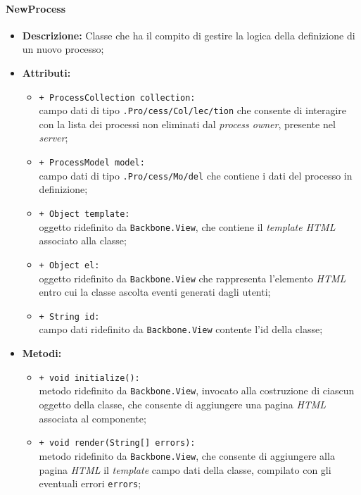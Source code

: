 \paragraph{NewProcess}
\begin{flushleft}
\begin{itemize}
\item \textbf{Descrizione:} Classe che ha il compito di gestire la logica della definizione di un nuovo processo;
\item \textbf{Attributi:}
\begin{sloppypar}
\begin{itemize}
\item \texttt{+ ProcessCollection collection:}\\ campo dati di tipo \texttt{\collection{}.Pro\fshyp{}cess\fshyp{}Col\fshyp{}lec\fshyp{}tion} che consente di interagire con la lista dei processi non eliminati dal \textit{process owner}, presente nel \textit{server};
\item \texttt{+ ProcessModel model:}\\ campo dati di tipo \texttt{\model{}.Pro\fshyp{}cess\fshyp{}Mo\fshyp{}del} che contiene i dati del processo in definizione;
\item \texttt{+ Object template:}\\ oggetto ridefinito da \texttt{Backbone.View}, che contiene il \textit{template HTML} associato alla classe;
\item \texttt{+ Object el:}\\ oggetto ridefinito da \texttt{Backbone.View} che rappresenta l'elemento \textit{HTML} entro cui la classe ascolta eventi generati dagli utenti;
\item \texttt{+ String id:}\\ campo dati ridefinito da \texttt{Backbone.View} contente l'id della classe;
\end{itemize}
\end{sloppypar}
\item \textbf{Metodi:}
\begin{sloppypar}
\begin{itemize}
\item \texttt{+ void initialize():}\\ metodo ridefinito da \texttt{Backbone.View}, invocato alla costruzione di ciascun oggetto della classe, che consente di aggiungere una pagina \textit{HTML} associata al componente;
\item \texttt{+ void render(String[] errors):}\\ metodo ridefinito da \texttt{Backbone.View}, che consente di aggiungere alla pagina \textit{HTML} il \textit{template} campo dati della classe, compilato con gli eventuali errori \texttt{errors};

\end{itemize}
\end{sloppypar}
\end{itemize}
\end{flushleft}
